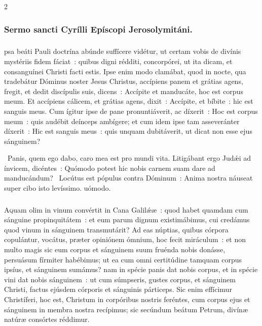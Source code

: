 \documentclass[9pt,twoside]{extarticle}
\begin{document}
\begin{multicols}{2}
\subsubsection*{\center Sermo sancti Cyrílli Epíscopi Jerosolymitáni.}
\subsubsection*{\center {}}
psa beáti Pauli doctrína abúnde suffícere vidétur, ut certam vobis de divínis mystériis fidem fáciat~: quibus digni rédditi, concorpórei, ut ita dicam, et consanguínei Christi facti estis. Ipse enim modo clamábat, quod in nocte, qua tradebátur Dóminus noster Jesus Christus, accípiens panem et grátias agens, fregit, et dedit discípulis suis, dicens~: Accípite et manducáte, hoc est corpus meum. Et accípiens cálicem, et grátias agens, dixit~: Accípite, et bíbite~: hic est sanguis meus. Cum ígitur ipse de pane pronuntiáverit, ac díxerit~: Hoc est corpus meum~: quis audébit deínceps ambígere; et cum idem ipse tam asseveránter díxerit~: Hic est sanguis meus~: quis unquam dubitáverit, ut dicat non esse ejus sánguinem?

\begin{tightlist}{}
~Panis, quem ego dabo, caro mea est pro mundi vita. Litigábant ergo Judǽi ad ínvicem, dicéntes~: \textred{*} Quómodo potest hic nobis carnem suam dare ad manducándum? ~Locútus est pópulus contra Dóminum~: Anima nostra náuseat super cibo isto levíssimo. uómodo.
\end{tightlist}

\subsubsection*{\center {}}
\lettrine{A}quam olim in vinum convértit in Cana Galilǽæ~: quod habet quamdam cum sánguine propinquitátem~: et eum parum dignum existimábimus, cui credámus quod vinum in sánguinem transmutárit? Ad eas núptias, quibus córpora copulántur, vocátus, præter opiniónem ómnium, hoc fecit miráculum~: et non multo magis sic eum corpus et sánguinem suum fruénda nobis donásse, persuásum fírmiter habébimus; ut ea cum omni certitúdine tamquam corpus ipsíus, et sánguinem sumámus? nam in spécie panis dat nobis corpus, et in spécie vini dat nobis sánguinem~: ut cum súmpseris, gustes corpus, et sánguinem Christi, factus ejúsdem córporis et sánguinis párticeps. Sic enim effícimur Christíferi, hoc est, Christum in corpóribus nostris feréntes, cum corpus ejus et sánguinem in membra nostra recípimus; sic secúndum beátum Petrum, divínæ natúræ consórtes réddimur. 


\end{multicols}
\end{document}
